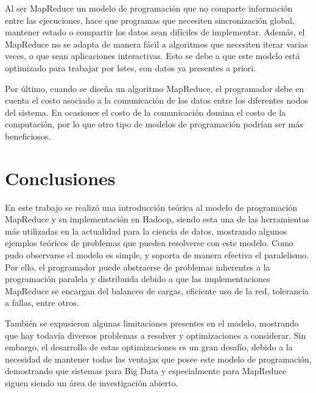 \documentclass[conference]{IEEEtran}
\begin{document}
Al ser MapReduce un modelo de programación que no comparte información entre las ejecuciones, hace que programas que necesiten sincronización global, mantener estado o compartir los datos sean difíciles de implementar.
Además, el MapReduce no se adapta de manera fácil a algoritmos que necesiten iterar varias veces, o que sean aplicaciones interactivas.
Esto se debe a que este modelo está optimizado para trabajar por lotes, con datos ya presentes a priori.


Por último, cuando se diseña un algoritmo MapReduce, el programador debe en cuenta el costo asociado a la comunicación de los datos entre los diferentes nodos del sistema. 
En ocasiones el costo de la comunicación domina el costo de la computación, por lo que otro tipo de modelos de programación podrían ser más beneficiosos.


\section{Conclusiones}
\label{conclu}

En este trabajo se realizó una introducción teórica al modelo de programación MapReduce y su implementación en Hadoop, siendo esta una de las herramientas más utilizadas en la actualidad para la ciencia de datos, mostrando algunos ejemplos teóricos de problemas que pueden resolverse con este modelo.
Como pudo observarse el modelo es simple, y soporta de manera efectiva el paralelismo.
Por ello, el programador puede abstraerse de problemas inherentes a la programación paralela y distribuida debido a que las implementaciones MapReduce se encargan del balanceo de cargas, eficiente uso de la red, tolerancia a fallas, entre otros.


También se expusieron algunas limitaciones presentes en el modelo, mostrando que hay todavía diversos problemas a resolver y optimizaciones a considerar.
Sin embargo, el desarrollo de estas optimizaciones es un gran desafío, debido a la necesidad de mantener todas las ventajas que posee este modelo de programación, demostrando que sistemas para Big Data y especialmente para MapReduce siguen siendo un área de investigación abierto.



\balance


\end{document}
